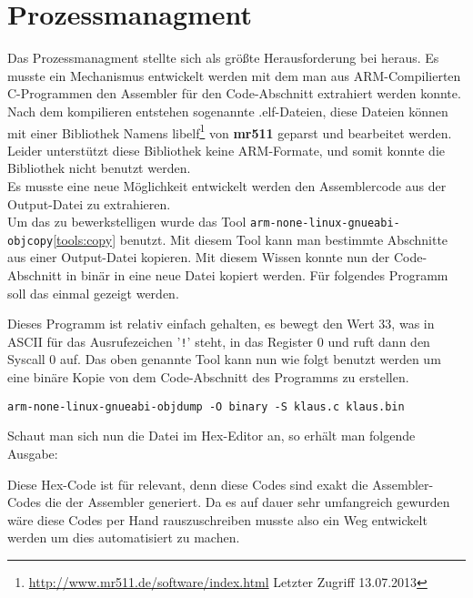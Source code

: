 \section{Prozessmanagment}
Das Prozessmanagment stellte sich als gr\"o\ss te Herausforderung bei \mops heraus. Es musste ein Mechanismus entwickelt werden mit dem man aus ARM-Compilierten C-Programmen den Assembler f\"ur den Code-Abschnitt extrahiert werden konnte. Nach dem kompilieren entstehen sogenannte .elf-Dateien, diese Dateien k\"onnen mit einer Bibliothek Namens libelf\footnote{\url{http://www.mr511.de/software/index.html} Letzter Zugriff 13.07.2013} von \textbf{mr511} geparst und bearbeitet werden. Leider unterst\"utzt diese Bibliothek keine ARM-Formate, und somit konnte die Bibliothek nicht benutzt werden.\\
Es musste eine neue M\"oglichkeit entwickelt werden den Assemblercode aus der Output-Datei zu extrahieren.\\
Um das zu bewerkstelligen wurde das Tool \texttt{arm-none-linux-gnueabi-objcopy}\ref{tools:copy} benutzt. Mit diesem Tool kann man bestimmte Abschnitte aus einer Output-Datei kopieren. Mit diesem Wissen konnte nun der Code-Abschnitt in bin\"ar in eine neue Datei kopiert werden. F\"ur folgendes Programm soll das einmal gezeigt werden.
\newpage

Dieses Programm ist relativ einfach gehalten, es bewegt den Wert 33, was in ASCII f\"ur das Ausrufezeichen '\texttt{!}' steht, in das Register 0 und ruft dann den Syscall 0 auf.
Das oben genannte Tool kann nun wie folgt benutzt werden um eine bin\"are Kopie von dem Code-Abschnitt des Programms zu erstellen.
\begin{lstlisting}
arm-none-linux-gnueabi-objdump -O binary -S klaus.c klaus.bin
\end{lstlisting}
Schaut man sich nun die Datei im Hex-Editor an, so erh\"alt man folgende Ausgabe:

Diese Hex-Code ist f\"ur \mops relevant, denn diese Codes sind exakt die Assembler-Codes die der Assembler generiert. Da es auf dauer sehr umfangreich gewurden w\"are diese Codes per Hand rauszuschreiben musste also ein Weg entwickelt werden um dies automatisiert zu machen.
